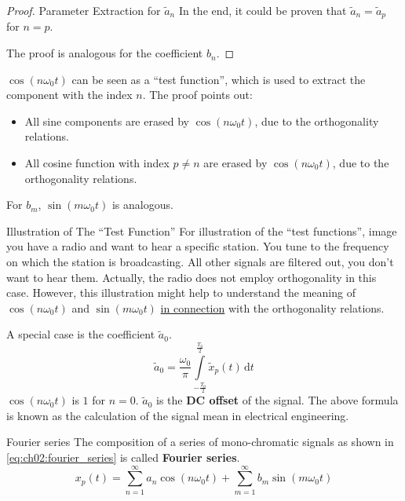 \begin{refsection}
\begin{proof}{Parameter Extraction for $\tilde{a}_n$}
	In the end, it could be proven that $\tilde{a}_n = \tilde{a}_p$ for $n = p$.
	
	The proof is analogous for the coefficient $b_n$.
\end{proof}

$\cos\left(n \omega_0 t\right)$ can be seen as a ``test function'', which is used to extract the component with the index $n$. The proof points out:
\begin{itemize}
	\item All sine components are erased by $\cos\left(n \omega_0 t\right)$, due to the orthogonality relations.
	\item All cosine function with index $p \neq n$ are erased by $\cos\left(n \omega_0 t\right)$, due to the orthogonality relations.
\end{itemize}
For $b_m$, $\sin\left(m \omega_0 t\right)$ is analogous.

\begin{excursus}{Illustration of The ``Test Function''}
	For illustration of the ``test functions'', image you have a radio and want to hear a specific station. You tune to the frequency on which the station is broadcasting. All other signals are filtered out, you don't want to hear them. Actually, the radio does not employ orthogonality in this case. However, this illustration might help to understand the meaning of $\cos\left(n \omega_0 t\right)$ and $\sin\left(m \omega_0 t\right)$ \underline{in connection} with the orthogonality relations.
\end{excursus}

A special case is the coefficient $\tilde{a}_0$.
\begin{equation}
	\tilde{a}_0 = \frac{\omega_0}{\pi} \int\limits_{-\frac{T_0}{2}}^{\frac{T_0}{2}} \tilde{x}_p(t) \, \mathrm{d} t
\end{equation}
$\cos\left(n \omega_0 t\right)$ is $1$ for $n = 0$. $\tilde{a}_0$ is the  \textbf{\ac{DC} offset} of the signal. The above formula is known as the calculation of the signal mean in electrical engineering.

\begin{definition}{Fourier series}
	The composition of a series of mono-chromatic signals as shown in \eqref{eq:ch02:fourier_series} is called  \textbf{Fourier series}.
	\begin{equation*}
		x_p(t) = \sum\limits_{n=1}^{\infty} a_n \cos\left(n \omega_0 t\right) + \sum\limits_{m=1}^{\infty} b_m \sin\left(m \omega_0 t\right)
	\end{equation*}
	

\end{definition}
\end{refsection}

